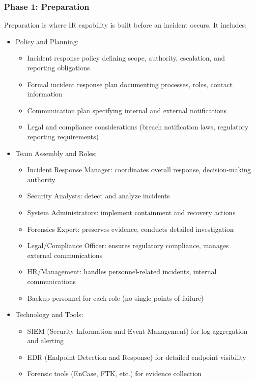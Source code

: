\documentclass[10pt]{article}
\begin{document}
\subsubsection*{Phase 1: Preparation}
Preparation is where IR capability is built before an incident occurs. It includes:

\begin{itemize}
  \item Policy and Planning:
  \begin{itemize}
  	\item Incident response policy defining scope, authority, escalation, and reporting obligations
  	\item Formal incident response plan documenting processes, roles, contact information
  	\item Communication plan specifying internal and external notifications
  	\item Legal and compliance considerations (breach notification laws, regulatory reporting requirements)
  \end{itemize}
  \item Team Assembly and Roles:
  \begin{itemize}
  	\item Incident Response Manager: coordinates overall response, decision-making authority
  	\item Security Analysts: detect and analyze incidents
  	\item System Administrators: implement containment and recovery actions
  	\item Forensics Expert: preserves evidence, conducts detailed investigation
  	\item Legal/Compliance Officer: ensures regulatory compliance, manages external communications
  	\item HR/Management: handles personnel-related incidents, internal communications
  	\item Backup personnel for each role (no single points of failure)
  \end{itemize}
  \item Technology and Tools:
  \begin{itemize}
  	\item SIEM (Security Information and Event Management) for log aggregation and alerting
  	\item EDR (Endpoint Detection and Response) for detailed endpoint visibility
  	\item Forensic tools (EnCase, FTK, etc.) for evidence collection

\end{itemize}
\end{itemize}
\end{document}
